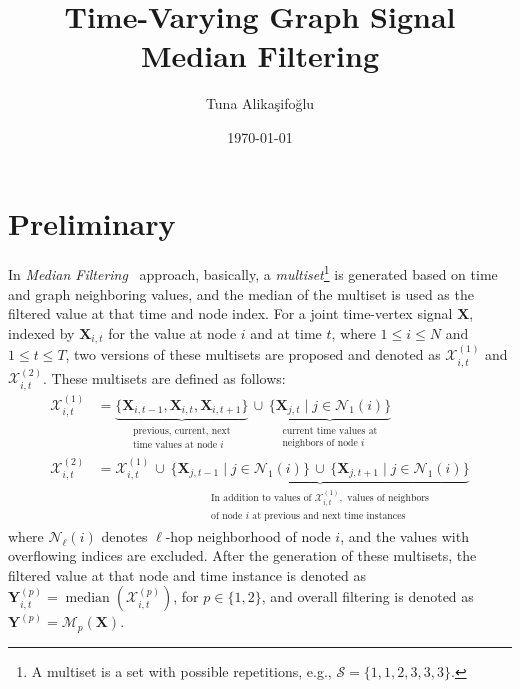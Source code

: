 \documentclass[a4paper,10pt,conference]{IEEEtran}
\title{Time-Varying Graph Signal Median Filtering}
\author{Tuna Alikaşifoğlu}
\date{\today}
\begin{document}
\maketitle

\section{Preliminary}
In \textit{Median Filtering}~\cite{median} approach, basically, a \textit{multiset}\footnote{A multiset is a set with possible repetitions, e.g., \(\mathcal{S}=\{1,1,2,3,3,3\} \).} is generated based on time and graph neighboring values, and the median of the multiset is used as the filtered value at that time and node index. For a joint time-vertex signal $\mathbf{X}$, indexed by $\mathbf{X}_{i,t}$ for the value at node $i$ and at time $t$, where $1\leq i \leq N$ and $1\leq t \leq T$, two versions of these multisets are proposed and denoted as $\mathcal{X}_{i,t}^{(1)}$ and $\mathcal{X}_{i,t}^{(2)}$. These multisets are defined as follows:
\begin{align}
	\mathcal{X}_{i,t}^{(1)} & = \underbrace{\{\mathbf{X}_{i,t-1},\mathbf{X}_{i,t},\mathbf{X}_{i,t+1}\}}_{\substack{\text{previous, current, next}                                                                                                                                          \\\text{time values at node } i}}\,\cup \, \underbrace{\{\mathbf{X}_{j,t}\mid j\in\mathcal{N}_{1}(i)\}}_{\substack{\text{current time values at}\\ \text{neighbors of node } i}} \\
	\mathcal{X}_{i,t}^{(2)} & = \mathcal{X}_{i,t}^{(1)}\,\cup \,\underbrace{\{\mathbf{X}_{j,t-1}\mid j\in\mathcal{N}_{1}(i)\} \,\cup \, \{\mathbf{X}_{j,t+1}\mid j\in\mathcal{N}_{1}(i)\}}_{\substack{\text{In addition to values of }\mathcal{X}_{i,t}^{(1)}, \text{ values of neighbors} \\ \text{of node } i \text{ at previous and next time instances}}}
\end{align}
where \(\mathcal{N}_\ell(i)\) denotes \(\ell \)-hop neighborhood of node \(i\), and the values with overflowing indices are excluded. After the generation of these multisets, the filtered value at that node and time instance is denoted as $\mathbf{Y}_{i,t}^{(p)}=\operatorname{median}(\mathcal{X}_{i,t}^{(p)})$, for $p\in \{ 1,2\} $, and overall filtering is denoted as $\mathbf{Y}^{(p)} = \mathcal{M}_{p}(\mathbf{X})$.
\end{document}
